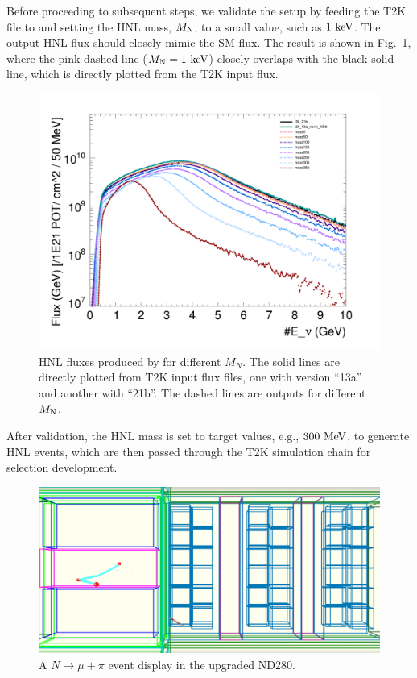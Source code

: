         Before proceeding to subsequent steps, we validate the setup by feeding the T2K  file to  and setting the HNL mass, $M_{\textrm{N}}$, to a small value, such as $1~\textrm{keV}$. The output HNL flux should closely mimic the SM flux. 
        The result is shown in Fig.~\ref{fig:hnl-fluxes}, where the pink dashed line ($M_{\textrm{N}}=1~\textrm{keV}$) closely overlaps with the black solid line, which is directly plotted from the T2K input flux.  
        \begin{figure}[!htb] 
            \centering 		
            \includegraphics[width=\sgfigwid\textwidth]{figures/hnl_fluxes.png}
            \caption{\label{fig:hnl-fluxes} HNL fluxes produced by  for different $M_N$. The solid lines are directly plotted from T2K input flux files, one with version ``13a'' and another with ``21b''. The dashed lines are  outputs for different $M_{\textrm{N}}$.} 
        \end{figure}
        After validation, the HNL mass is set to target values, e.g., $300~\textrm{MeV}$, to generate HNL events, which are then passed through the T2K simulation chain for selection development. 
        \begin{figure}[!htb] 
            \centering 		
            \includegraphics[width=\sgfigwid\textwidth]{figures/HNLEveDIs.png}
            \caption{\label{fig:hnl-evedis} A $N\rightarrow\mu+\pi$ event display in the upgraded ND280.} 
        \end{figure}

